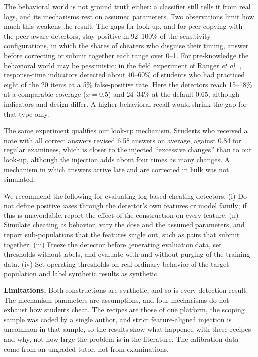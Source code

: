 \documentclass[conference,a4paper]{IEEEtran}
\begin{document}
The behavioral world is not ground truth either: a classifier still tells it from real logs, and its mechanisms rest on assumed parameters. Two observations limit how much this weakens the result. The gaps for look-up, and for peer copying with the peer-aware detectors, stay positive in 92--100\% of the sensitivity configurations, in which the shares of cheaters who disguise their timing, answer before correcting or submit together each range over 0--1. For pre-knowledge the behavioral world may be pessimistic: in the field experiment of Ranger \emph{et al.} \cite{ranger2020eexams}, response-time indicators detected about 40--60\% of students who had practiced eight of the 20 items at a 5\% false-positive rate. Here the detectors reach 15--18\% at a comparable coverage ($x = 0.5$) and 24--34\% at the default 0.65, although indicators and design differ. A higher behavioral recall would shrink the gap for that type only.

The same experiment qualifies our look-up mechanism. Students who received a note with all correct answers revised 6.58 answers on average, against 0.84 for regular examinees, which is closer to the injected ``excessive changes'' than to our look-up, although the injection adds about four times as many changes. A mechanism in which answers arrive late and are corrected in bulk was not simulated.

We recommend the following for evaluating log-based cheating detectors. (i) Do not define positive cases through the detector's own features or model family; if this is unavoidable, report the effect of the construction on every feature. (ii) Simulate cheating as behavior, vary the dose and the assumed parameters, and report sub-populations that the features single out, such as pairs that submit together. (iii) Freeze the detector before generating evaluation data, set thresholds without labels, and evaluate with and without purging of the training data. (iv) Set operating thresholds on real ordinary behavior of the target population and label synthetic results as synthetic.

\textbf{Limitations.} Both constructions are synthetic, and so is every detection result. The mechanism parameters are assumptions, and four mechanisms do not exhaust how students cheat. The recipes are those of one platform, the scoping sample was coded by a single author, and strict feature-aligned injection is uncommon in that sample, so the results show what happened with these recipes and why, not how large the problem is in the literature. The calibration data come from an ungraded tutor, not from examinations.
\end{document}
